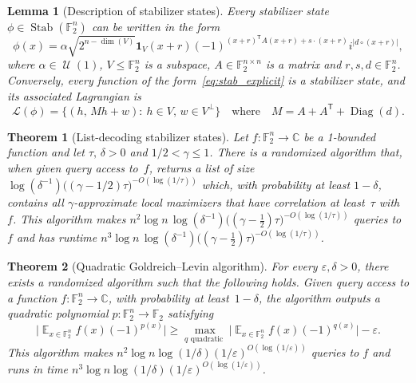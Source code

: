 \documentclass[10pt,a4paper]{amsart}
\newtheorem{theorem}{Theorem}
\newtheorem{lemma}{Lemma}
\newcommand{\C}{\mathbb{C}} %
\DeclareMathOperator{\Diag}{Diag}
\newcommand{\Exp}{\mathop{\mathbb{E}}}
\newcommand{\F}{\mathbb{F}} %
\newcommand{\Lcal}{\mathcal{L}}
\DeclareMathOperator{\Stab}{Stab}\DeclareMathOperator{\Spec}{Spec}
\DeclareMathOperator{\U}{\mathcal{U}}
\newcommand{\eps}{\varepsilon}
\newcommand{\one}{\mathbf{1}}
\newcommand{\tp}{\mathsf{T}}
\begin{document}
\begin{lemma}[Description of stabilizer states] \label{lem:stab_explicit}
    Every stabilizer state $\phi \in \Stab(\F_2^n)$ can be written in the form
    \begin{equation} \label{eq:stab_explicit}
        \phi(x) = \alpha \sqrt{2^{n-\dim(V)}} \one_V(x+r) (-1)^{(x+r)^\tp A(x+r) + s\cdot(x+r)} i^{|d\circ (x+r)|},
    \end{equation}
    where $\alpha\in \U(1)$, $V\leq \F_2^n$ is a subspace, $A\in \F_2^{n\times n}$ is a matrix and $r, s , d \in \F_2^n$.
    Conversely, every function of the form~\eqref{eq:stab_explicit} is a stabilizer state, and its associated Lagrangian is
    \begin{equation} \label{eq:Lagrangian_explicit}
        \Lcal(\phi) = \big\{(h,\, Mh+w):\: h\in V,\, w\in V^\perp\big\} \quad \text{where} \quad M = A+A^\tp+\Diag(d).
    \end{equation}
\end{lemma}

\begin{theorem}[List-decoding stabilizer states] \label{thm:list}
    Let $f:\F_2^n \to \C$ be a 1-bounded function and let $\tau,\, \delta>0$ and $1/2<\gamma\leq 1$.
    There is a randomized algorithm that, when given query access to~$f$, returns a list of size $\log(\delta^{-1}) \big((\gamma-1/2) \tau\big)^{-O(\log(1/\tau))}$ which, with probability at least $1-\delta$, contains all $\gamma$-approximate local maximizers that have correlation at least~$\tau$ with~$f$.
    This algorithm makes $n^2 \log n\, \log(\delta^{-1}) \big((\gamma - \tfrac{1}{2}) \tau\big)^{-O(\log(1/\tau))}$ queries to~$f$ and has runtime $n^3 \log n\, \log(\delta^{-1}) \big((\gamma - \tfrac{1}{2}) \tau\big)^{-O(\log(1/\tau))}$.
\end{theorem}

\begin{theorem}[Quadratic Goldreich--Levin algorithm] \label{thm:quadratic_GL}
For every $\eps,\delta>0$, there exists a randomized algorithm such that the following holds.
Given query access to a function $f: \F_2^n \rightarrow \C$, with probability at least~$1 - \delta$, the algorithm outputs a quadratic polynomial $p: \F_2^n \rightarrow \F_2$ satisfying
$$\big|\Exp_{x \in \F_2^n} f(x) (-1)^{p(x)}\big| \geq \max_{q \text{ quadratic }} \big|\Exp_{x \in \F_2^n} f(x) (-1)^{q(x)}\big| - \eps.$$
This algorithm makes $n^2 \log n \log(1/\delta) (1/\varepsilon)^{O(\log(1/\varepsilon))}$ queries to $f$ and runs in time $n^3 \log n \log(1/\delta) (1/\varepsilon)^{O(\log(1/\varepsilon))}$.
\end{theorem}
\end{document}

